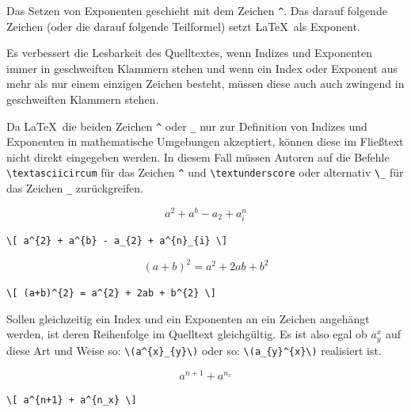 \documentclass[a4paper,10pt,twoside]{scrbook}
\begin{document}
{

Das Setzen von Exponenten geschieht mit dem Zeichen 
\verb!^!. Das darauf folgende Zeichen 
(oder die darauf folgende Teilformel) 
setzt \LaTeX\ als Exponent.


Es verbessert die Lesbarkeit
des Quelltextes, wenn Indizes und Exponenten immer in geschweiften Klammern stehen
und wenn ein Index oder Exponent aus mehr als nur einem einzigen Zeichen besteht, 
müssen diese auch auch zwingend in geschweiften Klammern stehen.

Da \LaTeX\ die beiden Zeichen \verb!^! oder \verb!_! nur zur Definition von
Indizes und Exponenten in mathematische Umgebungen akzeptiert, können diese 
im Fließtext nicht direkt eingegeben werden. In diesem Fall 
müssen Autoren auf die Befehle \verb!\textasciicircum!
für das Zeichen \verb!^! und \verb!\textunderscore!
oder alternativ \verb!\_! für das Zeichen \verb!_! zurückgreifen.


\begin{minipage}[c]{.4\textwidth}
\vspace*{-5mm}
\[ a^{2} + a^{b} - a_{2} + a^{n}_{i} \]
\end{minipage}
\hfill
\begin{minipage}[c]{.58\textwidth}
\setlength{\parskip}{1em}
\verb!\[ a^{2} + a^{b} - a_{2} + a^{n}_{i} \]!
\end{minipage}

\begin{minipage}[c]{.4\textwidth}
\vspace*{-5mm}
\[ (a+b)^{2} = a^{2} + 2ab + b^{2} \]
\end{minipage}
\hfill
\begin{minipage}[c]{.58\textwidth}
\setlength{\parskip}{1em}
\verb!\[ (a+b)^{2} = a^{2} + 2ab + b^{2} \]!
\end{minipage}


Sollen gleichzeitig ein Index und ein Exponenten an ein Zeichen angehängt werden, ist deren
Reihenfolge im Quelltext gleichgültig. Es ist also egal ob \(a^{x}_{y}\) auf diese Art und Weise 
so: \verb!\(a^{x}_{y}\)! oder so: \verb!\(a_{y}^{x}\)! realisiert ist. 

\begin{minipage}[c]{.4\textwidth}
\vspace*{-5mm}
\[ a^{n+1} + a^{n_x} \]
\end{minipage}
\hfill
\begin{minipage}[c]{.58\textwidth}
\setlength{\parskip}{1em}
\verb!\[ a^{n+1} + a^{n_x} \]!
\end{minipage}

}
\end{document}

